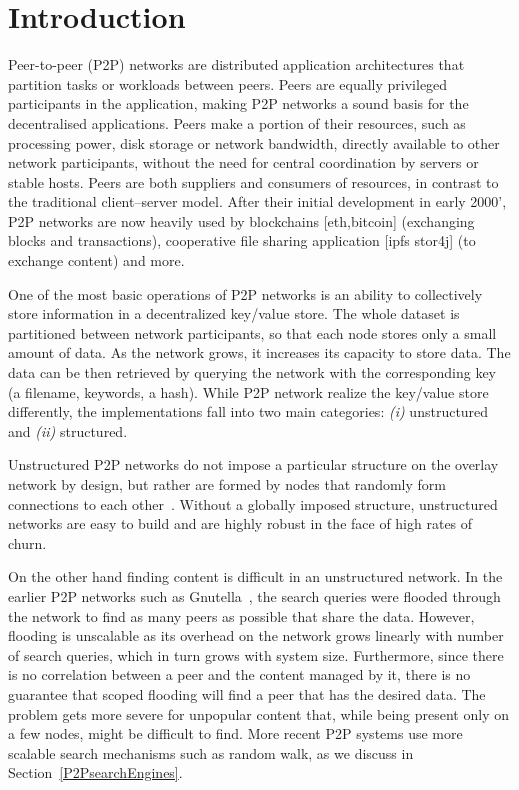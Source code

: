
\section{Introduction}

Peer-to-peer (P2P) networks are distributed application architectures that partition tasks or workloads between peers. Peers are equally privileged participants in the application, making P2P networks a sound basis for the decentralised applications. Peers make a portion of their resources, such as processing power, disk storage or network bandwidth, directly available to other network participants, without the need for central coordination by servers or stable hosts. Peers are both suppliers and consumers of resources, in contrast to the traditional client–server model. After their initial development in early 2000', P2P networks are now heavily used by blockchains [eth,bitcoin] (exchanging blocks and transactions), cooperative file sharing application [ipfs stor4j] (to exchange content) and more. 

One of the most basic operations of P2P networks is an ability to collectively store information in a decentralized key/value store. The whole dataset is partitioned between network participants, so that each node stores only a small amount of data. As the network grows, it increases its capacity to store data. The data can be then retrieved by querying the network with the corresponding key (\eg a filename, keywords, a hash). While P2P network realize the key/value store differently, the implementations fall into two main categories: \textit{(i)} unstructured and \textit{(ii)} structured.

Unstructured P2P networks do not impose a particular structure on the overlay network by design, but rather are formed by nodes that randomly form connections to each other~\cite{gnutella, gossip, kazaa}. Without a globally imposed structure, unstructured networks are easy to build and are highly robust in the face of high rates of churn. 

On the other hand finding content is difficult in an unstructured network. In the earlier P2P networks such as Gnutella~\cite{gnutella}, the search queries were flooded through the network to find as many peers as possible that share the data. However, flooding is unscalable as its overhead on the network grows linearly with number of search queries, which in turn grows with system size. Furthermore, since there is no correlation between a peer and the content managed by it, there is no guarantee that scoped flooding will find a peer that has the desired data. The problem gets more severe for unpopular content that, while being present only on a few nodes, might be difficult to find. More recent P2P systems use more scalable search mechanisms such as random walk, as we discuss in Section~\ref{P2PsearchEngines}. 

